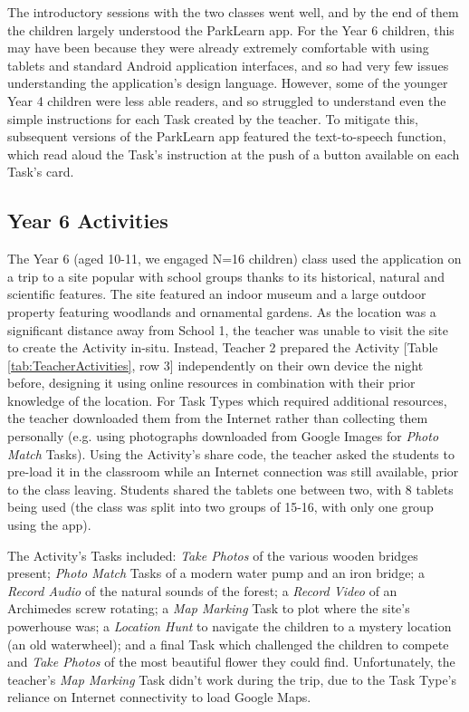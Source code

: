 The introductory sessions with the two classes went well, and by the end of them the children largely understood the ParkLearn app. For the Year 6 children, this may have been because they were already extremely comfortable with using tablets and standard Android application interfaces, and so had very few issues understanding the application’s design language. However, some of the younger Year 4 children were less able readers, and so struggled to understand even the simple instructions for each Task created by the teacher. To mitigate this, subsequent versions of the ParkLearn app featured the text-to-speech function, which read aloud the Task’s instruction at the push of a button available on each Task's card.

\subsection{Year 6 Activities}

The Year 6 (aged 10-11, we engaged N=16 children) class used the application on a trip to a site popular with school groups thanks to its historical, natural and scientific features. The site featured an indoor museum and a large outdoor property featuring woodlands and ornamental gardens. As the location was a significant distance away from School 1, the teacher was unable to visit the site to create the Activity in-situ. Instead, Teacher 2 prepared the Activity [Table \ref{tab:TeacherActivities}, row 3] independently on their own device the night before, designing it using online resources in combination with their prior knowledge of the location. For Task Types which required additional resources, the teacher downloaded them from the Internet rather than collecting them personally (e.g. using photographs downloaded from Google Images for \textit{Photo Match} Tasks). Using the Activity's share code, the teacher asked the students to pre-load it in the classroom while an Internet connection was still available, prior to the class leaving. Students shared the tablets one between two, with 8 tablets being used (the class was split into two groups of 15-16, with only one group using the app). 

The Activity's Tasks included: \textit{Take Photos} of the various wooden bridges present; \textit{Photo Match} Tasks of a modern water pump and an iron bridge; a \textit{Record Audio} of the natural sounds of the forest; a \textit{Record Video} of an Archimedes screw rotating; a \textit{Map Marking} Task to plot where the site's powerhouse was; a \textit{Location Hunt} to navigate the children to a mystery location (an old waterwheel); and a final Task which challenged the children to compete and \textit{Take Photos} of the most beautiful flower they could find. Unfortunately, the teacher's \textit{Map Marking} Task didn't work during the trip, due to the Task Type's reliance on Internet connectivity to load Google Maps.

